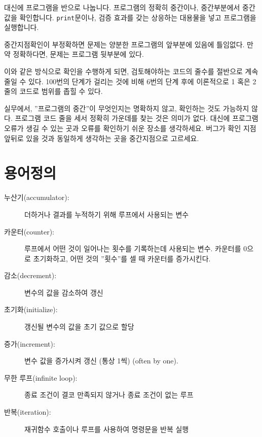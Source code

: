 대신에 프로그램을 반으로 나눕니다. 프로그램의 정확히 중간이나, 중간부분에서 중간값을 확인합니다.
{\tt print}문이나, 검증 효과를 갖는 상응하는 대용물을 넣고 프로그램을 실행합니다. 

중간지점확인이 부정확하면 문제는 양분한 프로그램의 앞부분에 있음에 틀임없다. 만약 정확하다면, 문제는 프로그램 뒷부분에 있다.

이와 같은 방식으로 확인을 수행하게 되면, 검토해야하는 코드의 줄수를 절반으로 계속 줄일 수 있다.
100번의 단계가 걸리는 것에 비해 6번의 단계 후에 이론적으로 1 혹은 2 줄의 코드로 범위를 좁힐 수 있다.

실무에서, ''프로그램의 중간''이 무엇인지는 명확하지 않고, 확인하는 것도 가능하지 않다. 프로그램 코드 줄을 세서 정확히 가운데를 찾는 것은 의미가 없다.
대신에 프로그램 오류가 생길 수 있는 곳과 오류를 확인하기 쉬운 장소를 생각하세요. 버그가 확인 지점 앞뒤로 있을 것과 동일하게 생각하는 곳을 중간지점으로 고르세요.

\section{용어정의}

\begin{description}

\item[누산기(accumulator):] 더하거나 결과를 누적하기 위해 루프에서 사용되는 변수

\item[카운터(counter):] 루프에서 어떤 것이 일어나는 횟수를 기록하는데 사용되는 변수.
카운터를 0으로 초기화하고, 어떤 것의 ''횟수''를 셀 때 카운터를 증가시킨다.

\item[감소(decrement):] 변수의 값을 감소하여 갱신

\item[초기화(initialize):]
갱신될 변수의 값을 초기 값으로 할당
\item[증가(increment):] 변수 값을 증가시켜 갱신 (통상 1씩)
(often by one).

\item[무한 루프(infinite loop):]
종료 조건이 결코 만족되지 않거나 종료 조건이 없는 루프

\item[반복(iteration):]
재귀함수 호출이나 루프를 사용하여 명령문을 반복 실행

\end{description}


